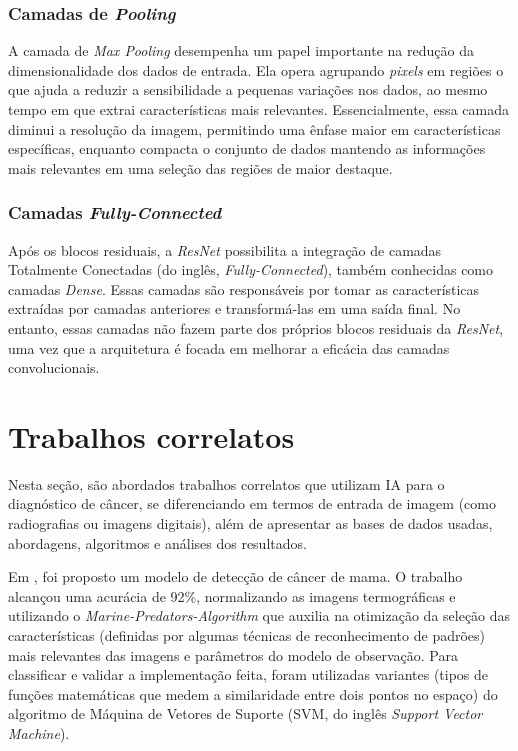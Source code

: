 \subsubsection{\esp Camadas de \textit{Pooling}} \label{convs}

A camada de \textit{Max Pooling} desempenha um papel importante na redução da dimensionalidade dos dados de entrada. Ela opera agrupando \textit{pixels} em regiões o que ajuda a reduzir a sensibilidade a pequenas variações nos dados, ao mesmo tempo em que extrai características mais relevantes. Essencialmente, essa camada diminui a resolução da imagem, permitindo uma ênfase maior em características específicas, enquanto compacta o conjunto de dados mantendo as informações mais relevantes em uma seleção das regiões de maior destaque.

\subsubsection{\esp Camadas \textit{Fully-Connected}} \label{fully}

Após os blocos residuais, a \textit{ResNet} possibilita a integração de camadas Totalmente Conectadas (do inglês, \textit{Fully-Connected}), também conhecidas como camadas \textit{Dense}. Essas camadas são responsáveis por tomar as características extraídas por camadas anteriores e transformá-las em uma saída final. No entanto, essas camadas não fazem parte dos próprios blocos residuais da \textit{ResNet}, uma vez que a arquitetura é focada em melhorar a eficácia das camadas convolucionais.



\section{\esp Trabalhos correlatos} \label{trabcorr}

Nesta seção, são abordados trabalhos correlatos que utilizam IA para o diagnóstico de câncer, se diferenciando em termos de entrada de imagem (como radiografias ou imagens digitais), além de apresentar as bases de dados usadas, abordagens, algoritmos e análises dos resultados. 

Em , foi proposto um modelo de detecção de câncer de mama. O trabalho alcançou uma acurácia de 92\%, normalizando as imagens termográficas e utilizando o \textit{Marine-Predators-Algorithm} que auxilia na otimização da seleção das características (definidas por algumas técnicas de reconhecimento de padrões) mais relevantes das imagens e parâmetros do modelo de observação. Para classificar e validar a implementação feita, foram utilizadas variantes (tipos de funções matemáticas que medem a similaridade entre dois pontos no espaço) do algoritmo de Máquina de Vetores de Suporte (SVM, do inglês \textit{Support Vector Machine}).


